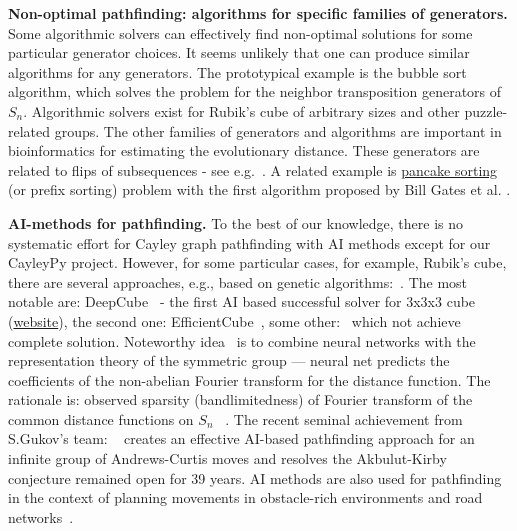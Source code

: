 \documentclass[atmp]{ipart_v1}
\numberwithin{equation}{section}
\theoremstyle{plain}%
\begin{document}
{\bf Non-optimal pathfinding: algorithms for specific families of generators.} 
Some algorithmic solvers can effectively find non-optimal solutions for some particular generator choices. It seems unlikely that one can produce similar algorithms for any generators. The prototypical example is the bubble sort algorithm, which solves the problem for the neighbor transposition generators of $S_n$. Algorithmic solvers exist for Rubik's cube of arbitrary sizes and other puzzle-related groups. The other families of generators and algorithms are important in bioinformatics for estimating the evolutionary distance. These generators are related to flips of subsequences - see e.g.~\cite{Pevzner1995human2mice, Pevzner1999cabbage2turnip, wilson2024cayley, bulteau2019parameterized}. A related example is \href{https://en.wikipedia.org/wiki/Pancake_sorting}{pancake sorting} (or prefix sorting) problem with the first algorithm proposed by Bill Gates et al. \cite{gates1979bounds}.

{\bf AI-methods for pathfinding.} 
To the best of our knowledge, there is no systematic effort for Cayley graph pathfinding with AI methods except for our CayleyPy project. However, for some particular cases, for example, Rubik's cube, there are several approaches, e.g., based on genetic algorithms:~\cite{swita2023solving}.%
The most notable are: DeepCube~\cite{mcaleer2019solving, agostinelli2019solving, khandelwal2024towards,agostinelli2024q} - the first AI based successful solver for 3x3x3 cube (\href{https://deepcube.igb.uci.edu/}{website}), the second one: EfficientCube~\cite{takano2023selfsupervision}, some other:~\cite{brunetto2017deep,johnson2021solving,amrutha2022deep,noever2022puzzle,chasmai2022cubetr,bedaywi2023solving,pan2021fourier} which not achieve complete solution. Noteworthy idea~\cite{pan2021fourier} is to combine neural networks with the representation theory of the symmetric group ---  neural net predicts the coefficients of the non-abelian Fourier transform for the distance function. The rationale is: observed sparsity (bandlimitedness) of Fourier transform of the common distance functions on $S_n$ ~\cite{swan2017harmonic}. The recent seminal achievement from S.Gukov's team: ~\cite{shehper2024makes} creates an effective AI-based pathfinding approach for an infinite group of Andrews-Curtis moves and resolves the  Akbulut-Kirby conjecture remained open for 39 years. AI methods are also used for pathfinding in the context of planning movements in obstacle-rich environments and road networks~\cite{pandy2022learning, kirilenko2023transpath}.
\end{document}
